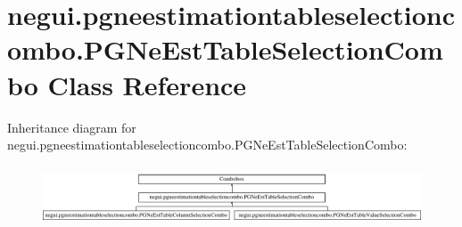 \hypertarget{classnegui_1_1pgneestimationtableselectioncombo_1_1PGNeEstTableSelectionCombo}{}\section{negui.\+pgneestimationtableselectioncombo.\+P\+G\+Ne\+Est\+Table\+Selection\+Combo Class Reference}
\label{classnegui_1_1pgneestimationtableselectioncombo_1_1PGNeEstTableSelectionCombo}
Inheritance diagram for negui.\+pgneestimationtableselectioncombo.\+P\+G\+Ne\+Est\+Table\+Selection\+Combo\+:\begin{figure}[H]
\begin{center}
\leavevmode
\includegraphics[height=1.787234cm]{classnegui_1_1pgneestimationtableselectioncombo_1_1PGNeEstTableSelectionCombo}
\end{center}
\end{figure}
